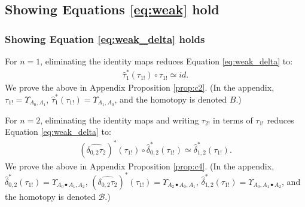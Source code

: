 \subsection{Showing Equations \ref{eq:weak} hold}
\subsubsection{Showing Equation \ref{eq:weak_delta} holds}
For $n=1$, eliminating the identity 
maps reduces Equation \ref{eq:weak_delta} to:
\begin{align*} 
\hat{\tau}_1^*(\tau_{1!}) \circ \tau_{1!} 
\simeq id.
\end{align*}
We prove the above in Appendix Proposition 
\ref{prop:c2}. (In the appendix, 
$\tau_{1!} = \Upsilon_{A_0,A_1}$, 
$\hat{\tau}_1^*(\tau_{1!}) = \Upsilon_{A_1,A_0}$, 
and the homotopy is denoted $B$.)

For $n=2$, eliminating the identity 
maps and writing $\tau_{2!}$ in terms 
of $\tau_{1!}$ reduces Equation \ref{eq:weak_delta} to:
\begin{align*} 
(\widehat{\delta_{0,2}\tau_2})^*(\tau_{1!}) \circ 
  \hat{\delta}_{0,2}^*(\tau_{1!})
\simeq \hat{\delta}_{1,2}^*(\tau_{1!}).
\end{align*}
We prove the above in Appendix Proposition 
\ref{prop:c4}. (In the appendix, 
$\hat{\delta}_{0,2}^*(\tau_{1!}) = 
\Upsilon_{A_0\bullet A_1, A_2}$, 
$(\widehat{\delta_{0,2}\tau_2})^*(\tau_{1!}) 
= \Upsilon_{A_2\bullet A_0,A_1}$, 
$\hat{\delta}_{1,2}^*(\tau_{1!}) =
\Upsilon_{A_0, A_1\bullet A_2}$, 
and the homotopy is denoted 
$\mathcal{B}$.)

